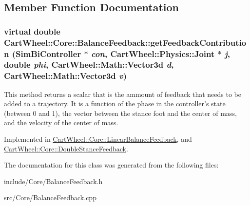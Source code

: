 \subsection{Member Function Documentation}
\hypertarget{classCartWheel_1_1Core_1_1BalanceFeedback_aa76a657676cd048cecfcd7963beb35cb}{
\subsubsection[{getFeedbackContribution}]{\setlength{\rightskip}{0pt plus 5cm}virtual double CartWheel::Core::BalanceFeedback::getFeedbackContribution ({\bf SimBiController} $\ast$ {\em con}, \/  {\bf CartWheel::Physics::Joint} $\ast$ {\em j}, \/  double {\em phi}, \/  {\bf CartWheel::Math::Vector3d} {\em d}, \/  {\bf CartWheel::Math::Vector3d} {\em v})}}
\label{classCartWheel_1_1Core_1_1BalanceFeedback_aa76a657676cd048cecfcd7963beb35cb}
This method returns a scalar that is the ammount of feedback that needs to be added to a trajectory. It is a function of the phase in the controller's state (between 0 and 1), the vector between the stance foot and the center of mass, and the velocity of the center of mass. 

Implemented in \hyperlink{classCartWheel_1_1Core_1_1LinearBalanceFeedback_a628981fc632cb32cde15da207f1320e5}{CartWheel::Core::LinearBalanceFeedback}, and \hyperlink{classCartWheel_1_1Core_1_1DoubleStanceFeedback_a5110582f3dff7c283bbc93bff221b8d2}{CartWheel::Core::DoubleStanceFeedback}.



The documentation for this class was generated from the following files:\begin{DoxyCompactItemize}
\item 
include/Core/BalanceFeedback.h\item 
src/Core/BalanceFeedback.cpp\end{DoxyCompactItemize}
